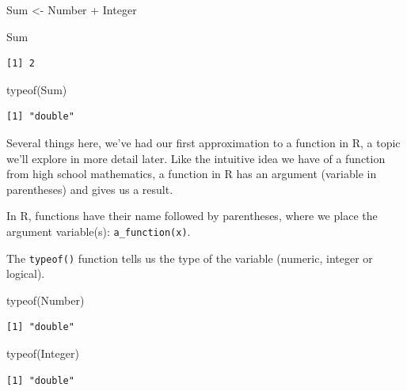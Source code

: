 \documentclass[
  letterpaper,
  DIV=11,
  numbers=noendperiod]{scrartcl}
\newenvironment{Shaded}{\begin{snugshade}}{\end{snugshade}}
\newcommand{\FunctionTok}[1]{\textcolor[rgb]{0.28,0.35,0.67}{#1}}
\newcommand{\NormalTok}[1]{\textcolor[rgb]{0.00,0.23,0.31}{#1}}
\newcommand{\OtherTok}[1]{\textcolor[rgb]{0.00,0.23,0.31}{#1}}
\newcommand{\SpecialCharTok}[1]{\textcolor[rgb]{0.37,0.37,0.37}{#1}}
\begin{document}
\begin{Shaded}
\begin{Highlighting}[]
\NormalTok{Sum }\OtherTok{\textless{}{-}}\NormalTok{ Number }\SpecialCharTok{+}\NormalTok{ Integer}

\NormalTok{Sum}
\end{Highlighting}
\end{Shaded}

\begin{verbatim}
[1] 2
\end{verbatim}

\begin{Shaded}
\begin{Highlighting}[]
\FunctionTok{typeof}\NormalTok{(Sum)}
\end{Highlighting}
\end{Shaded}

\begin{verbatim}
[1] "double"
\end{verbatim}

Several things here, we've had our first approximation to a function in
R, a topic we'll explore in more detail later. Like the intuitive idea
we have of a function from high school mathematics, a function in R has
an argument (variable in parentheses) and gives us a result.

In R, functions have their name followed by parentheses, where we place
the argument variable(s): \texttt{a\_function(x)}.

The \texttt{typeof()} function tells us the type of the variable
(numeric, integer or logical).

\begin{Shaded}
\begin{Highlighting}[]
\FunctionTok{typeof}\NormalTok{(Number)}
\end{Highlighting}
\end{Shaded}

\begin{verbatim}
[1] "double"
\end{verbatim}

\begin{Shaded}
\begin{Highlighting}[]
\FunctionTok{typeof}\NormalTok{(Integer)}
\end{Highlighting}
\end{Shaded}

\begin{verbatim}
[1] "double"
\end{verbatim}
\end{document}
